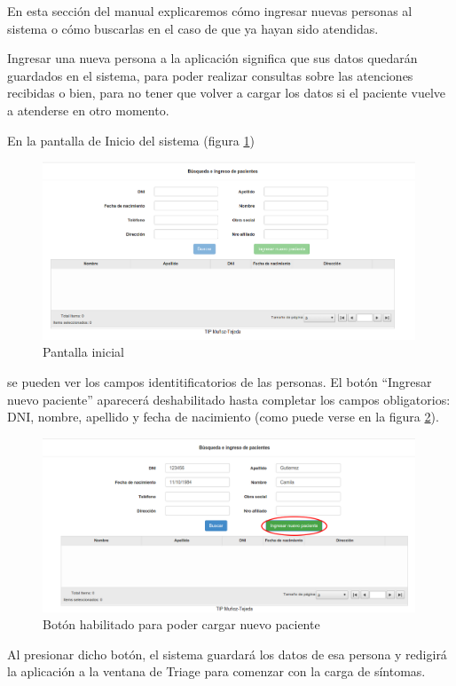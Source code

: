 En esta sección del manual explicaremos cómo ingresar nuevas personas al sistema o cómo buscarlas en el caso de que ya hayan sido atendidas.

Ingresar una nueva persona a la aplicación significa que sus datos quedarán guardados en el sistema, para poder realizar consultas sobre las atenciones recibidas o bien, para no tener que volver a cargar los datos si el paciente vuelve a atenderse en otro momento.

En la pantalla de Inicio del sistema (figura \ref{fig:inicio}) 
\begin{figure}
\centerline{\includegraphics[width=0.99\textwidth]{inicio.png}}
\caption{Pantalla inicial} \label{fig:inicio}
\end{figure}
se pueden ver los campos identitificatorios de las personas. El botón ``Ingresar nuevo paciente'' aparecerá deshabilitado hasta completar los campos obligatorios: DNI, nombre, apellido y fecha de nacimiento (como puede verse en la figura \ref{fig:inicio_nuevo}).
\begin{figure}
\centerline{\includegraphics[width=0.99\textwidth]{inicio_nuevo.png}}
\caption{Botón habilitado para poder cargar nuevo paciente} \label{fig:inicio_nuevo}
\end{figure}
Al presionar dicho botón, el sistema guardará los datos de esa persona y redigirá la aplicación a la ventana de Triage para comenzar con la carga de síntomas.

